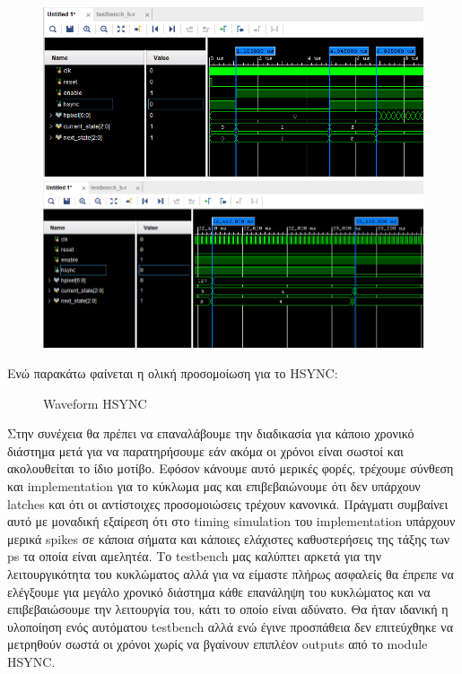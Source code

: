 \documentclass[12pt,a4paper]{article}
\begin{document}
		
		\begin{figure}[H]
				\centering
				\includegraphics[width=.4\linewidth]{pictures/mprosta kommati kimatomorfes}
				\label{fig:test1}
				\centering
				\includegraphics[width=.4\linewidth]{pictures/piso kommati kimatomorfes}
				\label{fig:test2}
		\end{figure}
	Ενώ παρακάτω φαίνεται η ολική προσομοίωση για το HSYNC:\\
	\begin{figure} [htbp]
		\caption{Waveform HSYNC}
		\label{Waveform HSYNC}
	\end{figure}
	
	Στην συνέχεια θα πρέπει να επαναλάβουμε την διαδικασία για κάποιο χρονικό διάστημα μετά για να παρατηρήσουμε εάν ακόμα οι χρόνοι είναι σωστοί και ακολουθείται το ίδιο μοτίβο. Εφόσον κάνουμε αυτό μερικές φορές, τρέχουμε σύνθεση και implementation για το κύκλωμα μας και επιβεβαιώνουμε ότι δεν υπάρχουν latches και ότι οι αντίστοιχες προσομοιώσεις τρέχουν κανονικά. Πράγματι συμβαίνει αυτό με μοναδική εξαίρεση ότι στο timing simulation του implementation υπάρχουν μερικά spikes σε κάποια σήματα και κάποιες ελάχιστες καθυστερήσεις της τάξης των ps τα οποία είναι αμελητέα. Το testbench μας καλύπτει αρκετά για την λειτουργικότητα του κυκλώματος αλλά για να είμαστε πλήρως ασφαλείς θα έπρεπε να ελέγξουμε για μεγάλο χρονικό διάστημα κάθε επανάληψη του κυκλώματος και να επιβεβαιώσουμε την λειτουργία του, κάτι το οποίο είναι αδύνατο. Θα ήταν ιδανική η υλοποίηση ενός αυτόματου testbench αλλά ενώ έγινε προσπάθεια δεν επιτεύχθηκε να μετρηθούν σωστά οι χρόνοι χωρίς να βγαίνουν επιπλέον outputs από το module HSYNC.
	
\end{document}
